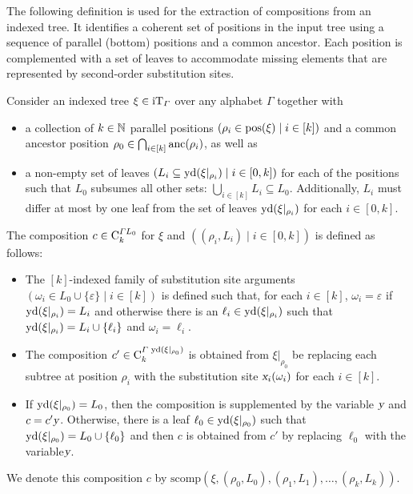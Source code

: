 \documentclass[../../document.tex]{subfiles}
\begin{document}
    The following definition is used for the extraction of  compositions from an indexed tree.
    It identifies a coherent set of positions in the input tree using a sequence of parallel (bottom) positions and a common ancestor.
    Each position is complemented with a set of leaves to accommodate missing elements that are represented by second-order substitution sites.

    \begin{definition}\label{def:dcp:comp}
        Consider an indexed tree \(\xi \in \operatorname{iT}_{\varGamma}\) over any alphabet \(\varGamma\) together with
        \begin{itemize}
            \item
                a collection of \(k \in \mathbb{N}\) parallel positions \((\rho_i \in \operatorname{pos}(\xi) \mid i \in [k])\) and
                a common ancestor position \(\rho_0 \in \bigcap_{i \in [k]} \operatorname{anc}(\rho_i)\), as well as
            \item
                a non-empty set of leaves \((L_i \subseteq \operatorname{yd}(\xi|_{\rho_i}) \mid i \in [0, k])\) for each of the positions such that
                \(L_0\) subsumes all other sets: \(\bigcup_{i\in[k]} L_i \subseteq L_0\). Additionally, \(L_i\) must differ at most by one leaf from the set of leaves \(\operatorname{yd}(\xi|_{\rho_i})\) for each \(i \in [0,k]\).
        \end{itemize}

        The  composition \(c \in \mathrm{C}^{\varGamma L_0}_k\) for \(\xi\) and \(((\rho_i, L_i) \mid i \in [0,k])\) is defined as follows:
        \begin{itemize}
            \item
                The \([k]\)-indexed family of substitution site arguments \((\omega_i \in L_0 \cup \{\varepsilon\} \mid i \in [k])\) is defined such that, for each \(i\in[k]\), \(\omega_i = \varepsilon\) if \(\operatorname{yd}(\xi|_{\rho_i}) = L_i\) and otherwise there is an \(\ell_i \in \operatorname{yd}(\xi|_{\rho_i})\) such that \(\operatorname{yd}(\xi|_{\rho_i}) = L_i \cup \{\ell_i\}\) and \(\omega_i = \ell_i\).
            \item
                The composition \(c' \in \mathrm{C}^{\varGamma\,\operatorname{yd}(\xi|_{\rho_0})}_k\) is obtained from \(\xi|_{\rho_0}\) be replacing each subtree at position \(\rho_i\) with the substitution site \(\textsl{x}_i(\omega_i)\) for each \(i \in [k]\).
            \item
                If \(\operatorname{yd}(\xi|_{\rho_0}) = L_0\), then the composition is supplemented by the variable \(\textsl{y}\) and \(c=c' \textsl{y}\).
                Otherwise, there is a leaf \(\ell_0 \in \operatorname{yd}(\xi|_{\rho_0})\) such that \(\operatorname{yd}(\xi|_{\rho_0}) = L_0 \cup \{\ell_0\}\) and then \(c\) is obtained from \(c'\) by replacing \(\ell_0\) with the variable\(\textsl{y}\).
        \end{itemize}
        We denote this composition \(c\) by \(\mathrm{scomp}(\xi, (\rho_0, L_0), (\rho_1, L_1), \ldots, (\rho_k, L_k))\).
    \end{definition}
\end{document}
